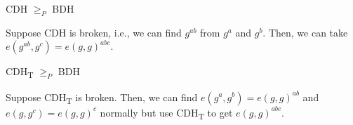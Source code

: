 \documentclass[notes]{agony}
\begin{document}
\begin{prop}
  CDH $\geq_P$ BDH
\end{prop}
\begin{prf}
  Suppose CDH is broken, i.e., we can find $g^{ab}$ from $g^a$ and $g^b$.
  Then, we can take $e(g^{ab},g^c) = e(g,g)^{abc}$.
\end{prf}

\begin{prop}
  CDH\textsubscript{T} $\geq_P$ BDH
\end{prop}
\begin{prf}
  Suppose CDH\textsubscript{T} is broken.
  Then, we can find $e(g^a,g^b) = e(g,g)^{ab}$ and $e(g,g^c) = e(g,g)^c$
  normally but use CDH\textsubscript{T} to get $e(g,g)^{abc}$.
\end{prf}
\end{document}
